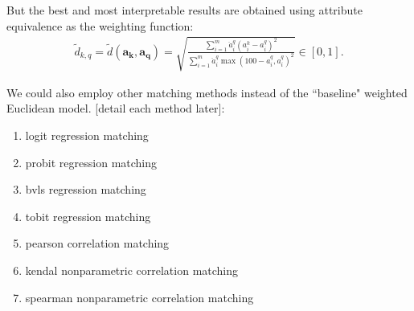 \documentclass{elsarticle} %
\begin{document}
But the best and most interpretable results are obtained using attribute
equivalence as the weighting function:
\begin{gather}
    \tilde{d}_{k,q} =
    \tilde{d}(\boldsymbol{a_k}, \boldsymbol{a_q}) =
    \sqrt{
    \frac{
    \sum_{i = 1}^{m}{
    \ddot{a}_{i}^{q} (a_{i}^{k} - a_{i}^{q})^2
    }
    }{
    \sum_{i = 1}^{m}{
    \ddot{a}_{i}^{q} \max(100 - a_{i}^{q}, a_{i}^{q})^2
    }
    }
    }
    \in [0,1]
    .
\end{gather}

We could also employ other matching methods instead of the ``baseline" weighted
Euclidean model. [detail each method later]:
\begin{enumerate}
    \item logit regression matching
    \item probit regression matching
    \item bvls regression matching
    \item tobit regression matching
    \item pearson correlation matching
    \item kendal nonparametric correlation matching
    \item spearman nonparametric correlation matching
\end{enumerate}
\end{document}
